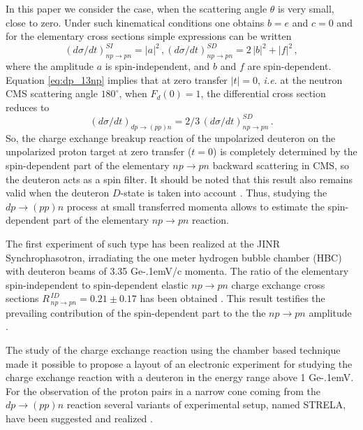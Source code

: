 \documentclass[twocolumn,epjc3]{svjour3}
\newcommand{\np}     {\ensuremath{np \rightarrow pn}\xspace}
\newcommand{\dpchex} {\ensuremath{dp \rightarrow (pp)n}\xspace}
\newcommand{\GeVc}   {Ge\kern-.1emV/c\xspace}
\newcommand{\GeV}    {Ge\kern-.1emV\xspace}
\begin{document}
In this paper we consider the case, when the scattering angle $\theta$ is very
small, close to zero. Under such kinematical conditions one obtains $b = e$ and
$c = 0$ and for the elementary cross sections simple expressions can be written
\begin{equation}
  (d\sigma/dt)^{SI}_{\np} = |a|^2\,,
  (d\sigma/dt)^{SD}_{\np} = 2\,|b|^2 + |f|^2\,,
\end{equation}
where the amplitude $a$ is spin-independent, and $b$ and $f$ are spin-dependent.
Equation \eqref{eq:dp_13np} implies that at zero transfer $|t| = 0$,
\textit{i.e.} at the neutron CMS scattering angle $180^\circ$, when
$F_d(0) = 1$, the differential cross section reduces to
\begin{equation}
  \label{eq:dp_23np}
  (d\sigma/dt)_{\dpchex} = 2/3\,(d\sigma/dt)^{SD}_{\np}\,.
\end{equation}
So, the charge exchange breakup reaction of the unpolarized deuteron on the
unpolarized proton target at zero transfer ($t = 0$) is completely determined by
the spin-dependent part of the elementary \np backward scattering in CMS, so the
deuteron acts as a spin filter. It should be noted that this result also remains
valid when the deuteron $D$-state is taken into account \cite{led04}. Thus,
studying the \dpchex process at small transferred momenta allows to estimate the
spin-dependent part of the elementary \np reaction.

The first experiment of such type has been realized at the JINR
Synchrophasotron, irradiating the one meter hydrogen bubble chamber (HBC) with
deuteron beams of 3.35 \GeVc momenta. The ratio of the elementary
spin-independent to spin-dependent elastic \np charge exchange cross sections
$R^{\,ID}_{\,\np} = 0.21 \pm 0.17$ has been obtained \cite{gla08}. This result
testifies the prevailing contribution of the spin-dependent part to the the \np
amplitude \cite{gla02,gla08}.

The study of the charge exchange reaction using the chamber based technique made
it possible to propose a layout of an electronic experiment for studying the
charge exchange reaction with a deuteron in the energy range above 1 \GeV. For
the observation of the proton pairs in a narrow cone coming from the \dpchex
reaction several variants of experimental setup, named STRELA, have been
suggested and realized \cite{gla13}.
\end{document}
